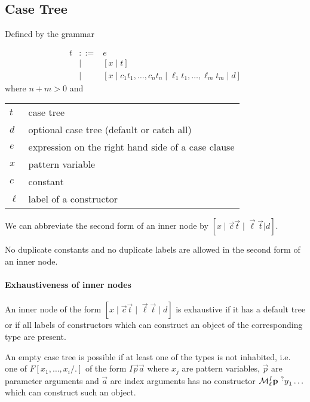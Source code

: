 \subsection{Case Tree}


Defined by the grammar

$$
    \begin{array}{lllll}
        t
        &::=& e
        \\
        &\mid& [x \mid t]
        \\
        &\mid& [
            x
            \mid
            c_1 t_1, \ldots,  c_n t_n \mid
            \ell_1 t_1, \ldots, \ell_m t_m
            \mid
            d
        ]
    \end{array}
$$
%
where $n + m > 0$ and
%
\begin{center}
    \begin{tabular}{l p{8cm}}
        $t$ & case tree
        \\
        $d$ & optional case tree (default or catch all)
        \\
        $e$ & expression on the right hand side of a case clause
        \\
        $x$ & pattern variable
        \\
        $c$ & constant
        \\
        $\ell$ & label of a constructor
    \end{tabular}
\end{center}

We can abbreviate the second form of an inner node by $[x \mid \vec c\vec t \mid
\vec\ell \vec t | d]$.


No duplicate constants and no duplicate labels are allowed in the second form of
an inner node.



\paragraph{Exhaustiveness of inner nodes}
%

An inner node of the form $[x \mid \vec c \vec t \mid \vec\ell \vec t \mid d]$ is
exhaustive if it has a default tree or if all labels of constructors which can
construct an object of the corresponding type are present.

An empty case tree is possible if at least one of the types is not inhabited,
i.e. one of $F[x_1, \ldots, x_i/.]$ of the form $I \vec p \vec a$  where $x_j$
are pattern variables, $\vec p$ are parameter arguments and $\vec a$ are index
arguments has no constructor ${\cal M}^I_\ell {\mathbf p} {\ ^?y}_1 \ldots$
which can construct such an object.

